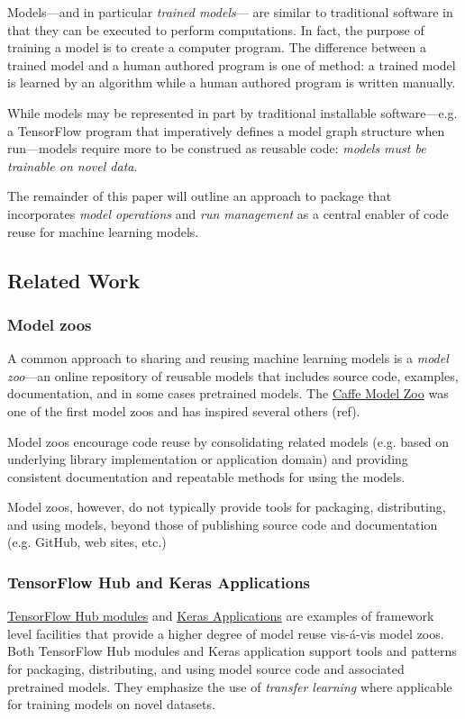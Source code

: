 \documentclass{article}
\begin{document}
Models---and in particular \emph{trained models}--- are similar to
traditional software in that they can be executed to perform
computations. In fact, the purpose of training a model is to create a
computer program. The difference between a trained model and a human
authored program is one of method: a trained model is learned by an
algorithm while a human authored program is written manually.

While models may be represented in part by traditional installable
software---e.g. a TensorFlow program that imperatively defines a model
graph structure when run---models require more to be construed as
reusable code: \emph{models must be trainable on novel data}.

The remainder of this paper will outline an approach to package that
incorporates \emph{model operations} and \emph{run management} as a
central enabler of code reuse for machine learning models.

\subsection{Related Work}

\subsubsection{Model zoos}

A common approach to sharing and reusing machine learning models is a
\emph{model zoo}---an online repository of reusable models that
includes source code, examples, documentation, and in some cases
pretrained models. The \href{Caffe Model Zoo}{Caffe Model Zoo} was one
of the first model zoos and has inspired several others (ref).

Model zoos encourage code reuse by consolidating related models
(e.g. based on underlying library implementation or application
domain) and providing consistent documentation and repeatable methods
for using the models.

Model zoos, however, do not typically provide tools for packaging,
distributing, and using models, beyond those of publishing source code
and documentation (e.g. GitHub, web sites, etc.)

\subsubsection{TensorFlow Hub and Keras Applications}

\href{https://www.tensorflow.org/hub/}{TensorFlow Hub modules} and
\href{https://keras.io/applications/}{Keras Applications} are examples
of framework level facilities that provide a higher degree of model
reuse vis-\'a-vis model zoos. Both TensorFlow Hub modules and Keras
application support tools and patterns for packaging, distributing,
and using model source code and associated pretrained models. They
emphasize the use of \emph{transfer learning} where applicable for
training models on novel datasets.
\end{document}
